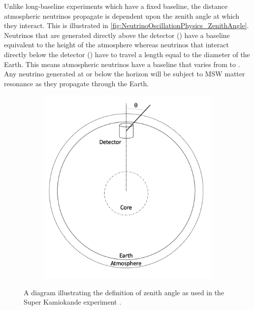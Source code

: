 Unlike long-baseline experiments which have a fixed baseline, the distance atmospheric neutrinos propagate is dependent upon the zenith angle at which they interact. This is illustrated in \autoref{fig:NeutrinoOscillationPhysics_ZenithAngle}. Neutrinos that are generated directly above the detector () have a baseline equivalent to the height of the atmosphere whereas neutrinos that interact directly below the detector () have to travel a length equal to the diameter of the  Earth. This means atmospheric neutrinos have a baseline that varies from  to . Any neutrino generated at or below the horizon will be subject to MSW matter resonance as they propagate through the Earth.

\begin{figure}[h]
  \begin{subfigure}[t]{0.40\textwidth}
    \includegraphics[width=\textwidth, trim={0mm 0mm 0mm 0mm}, clip,page=1]{Figures/Theory/ZenithAngle.pdf}
  \end{subfigure}
  \caption{A diagram illustrating the definition of zenith angle as used in the Super Kamiokande experiment \cite{Ashie_2005}.}
  \label{fig:NeutrinoOscillationPhysics_ZenithAngle}
\end{figure}

